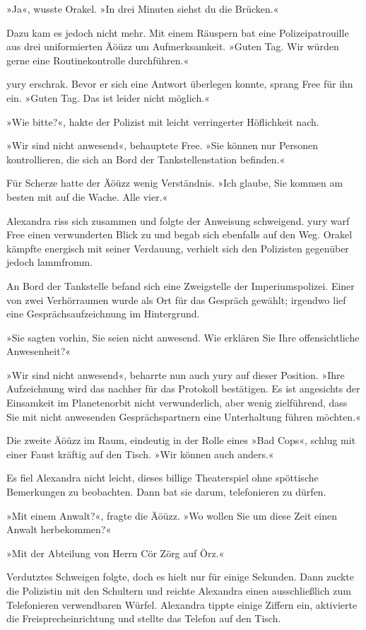 »Ja«, wusste Orakel. »In drei Minuten siehst du die Brücken.«

Dazu kam es jedoch nicht mehr. Mit einem Räuspern bat eine Polizeipatrouille aus drei uniformierten Äöüzz um Aufmerksamkeit. »Guten Tag. Wir würden gerne eine Routinekontrolle durchführen.«

yury erschrak. Bevor er sich eine Antwort überlegen konnte, sprang Free für ihn ein. »Guten Tag. Das ist leider nicht möglich.«

»Wie bitte?«, hakte der Polizist mit leicht verringerter Höflichkeit nach.

»Wir sind nicht anwesend«, behauptete Free. »Sie können nur Personen kontrollieren, die sich an Bord der Tankstellenstation befinden.«

Für Scherze hatte der Äöüzz wenig Verständnis. »Ich glaube, Sie kommen am besten mit auf die Wache. Alle vier.«

Alexandra riss sich zusammen und folgte der Anweisung schweigend. yury warf Free einen verwunderten Blick zu und begab sich ebenfalls auf den Weg. Orakel kämpfte energisch mit seiner Verdauung, verhielt sich den Polizisten gegenüber jedoch lammfromm.

An Bord der Tankstelle befand sich eine Zweigstelle der Imperiumspolizei. Einer von zwei Verhörraumen wurde als Ort für das Gespräch gewählt; irgendwo lief eine Gesprächsaufzeichnung im Hintergrund.

»Sie sagten vorhin, Sie seien nicht anwesend. Wie erklären Sie Ihre offensichtliche Anwesenheit?«

»Wir sind nicht anwesend«, beharrte nun auch yury auf dieser Position. »Ihre Aufzeichnung wird das nachher für das Protokoll bestätigen. Es ist angesichts der Einsamkeit im Planetenorbit nicht verwunderlich, aber wenig zielführend, dass Sie mit nicht anwesenden Gesprächspartnern eine Unterhaltung führen möchten.«

Die zweite Äöüzz im Raum, eindeutig in der Rolle eines »Bad Cops«, schlug mit einer Faust kräftig auf den Tisch. »Wir können auch anders.«

Es fiel Alexandra nicht leicht, dieses billige Theaterspiel ohne spöttische Bemerkungen zu beobachten. Dann bat sie darum, telefonieren zu dürfen.

»Mit einem Anwalt?«, fragte die Äöüzz. »Wo wollen Sie um diese Zeit einen Anwalt herbekommen?«

»Mit der Abteilung von Herrn Cör Zörg auf Örz.«

Verdutztes Schweigen folgte, doch es hielt nur für einige Sekunden. Dann zuckte die Polizistin mit den Schultern und reichte Alexandra einen ausschließlich zum Telefonieren verwendbaren Würfel. Alexandra tippte einige Ziffern ein, aktivierte die Freisprecheinrichtung und stellte das Telefon auf den Tisch.

